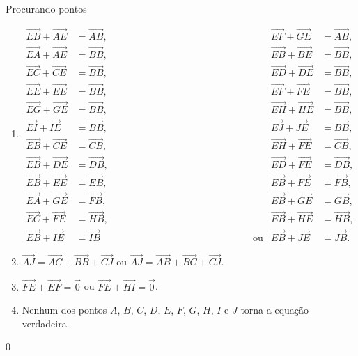 \begin{answer}{Procurando pontos}
{\begin{enumerate}
\item {} 
\begin{align*}
\overrightarrow{EB} + \overrightarrow{AE} &= \overrightarrow{AB}, & 
\overrightarrow{EF} + \overrightarrow{GE} &= \overrightarrow{AB}, \\
\overrightarrow{EA} + \overrightarrow{AE} &= \overrightarrow{BB}, &
\overrightarrow{EB} + \overrightarrow{BE} &= \overrightarrow{BB}, \\
\overrightarrow{EC} + \overrightarrow{CE} &= \overrightarrow{BB}, &
\overrightarrow{ED} + \overrightarrow{DE} &= \overrightarrow{BB}, \\
\overrightarrow{EE} + \overrightarrow{EE} &= \overrightarrow{BB}, &
\overrightarrow{EF} + \overrightarrow{FE} &= \overrightarrow{BB}, \\
\overrightarrow{EG} + \overrightarrow{GE} &= \overrightarrow{BB}, &
\overrightarrow{EH} + \overrightarrow{HE} &= \overrightarrow{BB}, \\
\overrightarrow{EI} + \overrightarrow{IE} &= \overrightarrow{BB}, &
\overrightarrow{EJ} + \overrightarrow{JE} &= \overrightarrow{BB}, \\
\overrightarrow{EB} + \overrightarrow{CE} &= \overrightarrow{CB}, &
\overrightarrow{EH} + \overrightarrow{FE} &= \overrightarrow{CB}, \\
\overrightarrow{EB} + \overrightarrow{DE} &= \overrightarrow{DB}, &
\overrightarrow{ED} + \overrightarrow{FE} &= \overrightarrow{DB}, \\
\overrightarrow{EB} + \overrightarrow{EE} &= \overrightarrow{EB}, &
\overrightarrow{EB} + \overrightarrow{FE} &= \overrightarrow{FB}, \\
\overrightarrow{EA} + \overrightarrow{GE} &= \overrightarrow{FB}, &
\overrightarrow{EB} + \overrightarrow{GE} &= \overrightarrow{GB}, \\
\overrightarrow{EC} + \overrightarrow{FE} &= \overrightarrow{HB}, &
\overrightarrow{EB} + \overrightarrow{HE} &= \overrightarrow{HB}, \\
\overrightarrow{EB} + \overrightarrow{IE} &= \overrightarrow{IB}\text{ { }{ }{ }{ }{ }{ }{ }{ }{ }{ }{ }{ }{ }{ }{ }{ }{ }{ }{ }{ }{ }{ }{ ou}} & 
\overrightarrow{EB} + \overrightarrow{JE} &= \overrightarrow{JB}.
\end{align*}

\clearpage

\item {} 
\(\overrightarrow{AJ} = \overrightarrow{AC} + \overrightarrow{BB} + \overrightarrow{CJ}\) ou \(\overrightarrow{AJ} = \overrightarrow{AB} + \overrightarrow{BC} + \overrightarrow{CJ}\).

\item {} 
\(\overrightarrow{FE} + \overrightarrow{EF} = \vec{0}\) ou \(\overrightarrow{FE} + \overrightarrow{HI} = \vec{0}\).

\item {} 
Nenhum dos pontos \(A\), \(B\), \(C\), \(D\), \(E\), \(F\), \(G\), \(H\), \(I\) e \(J\) torna a equação verdadeira.

\end{enumerate}
}{0}
\end{answer}

